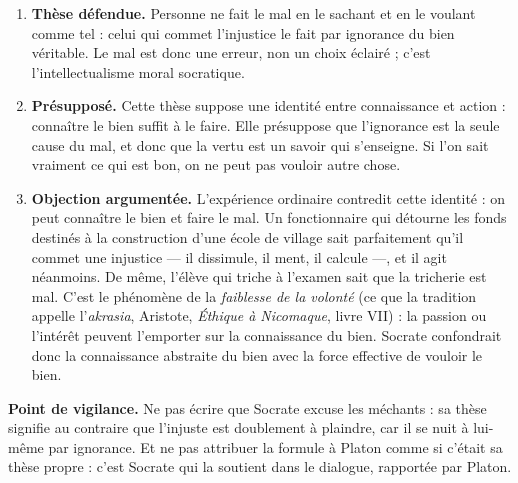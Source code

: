 \documentclass[11pt]{article}
\newcommand{\cle}[1]{{\popxbold\color{popdark}#1}}
\begin{document}
\begin{corrige}
\begin{enumerate}
\item \textbf{Thèse défendue.} Personne ne fait le mal en le sachant et en le voulant comme tel : celui qui commet l'injustice le fait par ignorance du bien véritable. Le mal est donc une erreur, non un choix éclairé ; c'est l'\cle{intellectualisme moral} socratique.
\item \textbf{Présupposé.} Cette thèse suppose une identité entre \cle{connaissance} et \cle{action} : connaître le bien suffit à le faire. Elle présuppose que l'ignorance est la seule cause du mal, et donc que la vertu est un savoir qui s'enseigne. Si l'on sait vraiment ce qui est bon, on ne peut pas vouloir autre chose.
\item \textbf{Objection argumentée.} L'expérience ordinaire contredit cette identité : on peut connaître le bien et faire le mal. Un fonctionnaire qui détourne les fonds destinés à la construction d'une école de village sait parfaitement qu'il commet une injustice --- il dissimule, il ment, il calcule ---, et il agit néanmoins. De même, l'élève qui triche à l'examen sait que la tricherie est mal. C'est le phénomène de la \emph{faiblesse de la volonté} (ce que la tradition appelle l'\emph{akrasia}, Aristote, \emph{Éthique à Nicomaque}, livre VII) : la passion ou l'intérêt peuvent l'emporter sur la connaissance du bien. Socrate confondrait donc la connaissance abstraite du bien avec la force effective de vouloir le bien.
\end{enumerate}
\textbf{Point de vigilance.} Ne pas écrire que Socrate \guillemotleft excuse les méchants \guillemotright : sa thèse signifie au contraire que l'injuste est doublement à plaindre, car il se nuit à lui-même par ignorance. Et ne pas attribuer la formule à Platon comme si c'était sa thèse propre : c'est Socrate qui la soutient dans le dialogue, rapportée par Platon.
\end{corrige}
\end{document}

